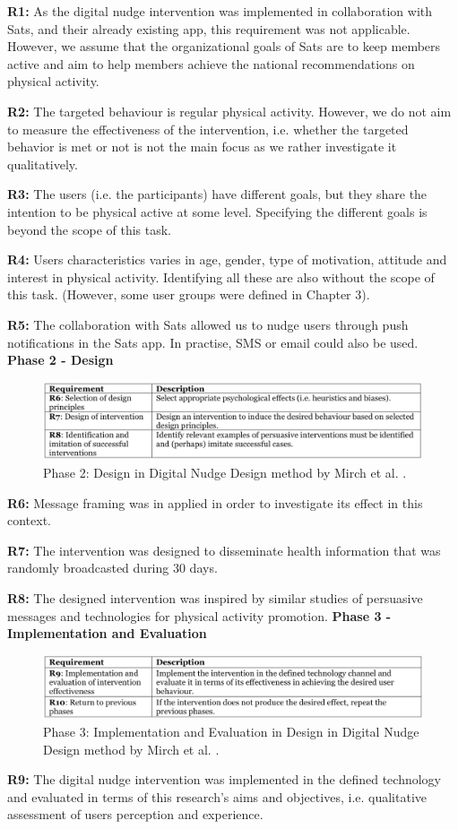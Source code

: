 \textbf{ R1:} As the digital nudge intervention was implemented in collaboration with Sats, and their already existing app, this requirement was not applicable. However, we assume that the organizational goals of Sats are to keep members active and aim to help members achieve the national recommendations on physical activity.

\textbf{R2: }The targeted behaviour is regular physical activity. However, we do not aim to measure the effectiveness of the intervention, i.e. whether the targeted behavior is met or not is not the main focus as we rather investigate it qualitatively. 

\textbf{R3:} The users (i.e. the participants)  have different goals, but they share the intention to be physical active at some level. Specifying the different goals is beyond the scope of this task.

\textbf{R4: }Users characteristics varies in age, gender, type of motivation, attitude and interest in physical activity. Identifying all these are also without the scope of this task. (However, some user groups were defined in Chapter 3).

\textbf{R5:} The collaboration with Sats allowed us to nudge users through push notifications in the Sats app. In practise, SMS or email could also be used. 
\bigbreak
\textbf{Phase 2 - Design }
\begin{figure}[h]
\includegraphics[width=1\textwidth]{images/Phase2.png}
\caption{Phase 2: Design in Digital Nudge Design method by Mirch et al. \cite{mirsch_making_2018}.}
\end{figure}
\bigbreak
\textbf{R6:} Message framing was in applied in order to investigate its effect in this context. 

\textbf{R7:} The intervention was designed to disseminate health information that was randomly broadcasted during 30 days. 

\textbf{R8:} The designed intervention was inspired by similar studies of persuasive messages and technologies for physical activity promotion. 
 \bigbreak
\textbf{Phase 3 - Implementation and Evaluation }
\bigbreak
\begin{figure}[ht]
\includegraphics[width=1\textwidth]{images/Phase3.png}
\caption{Phase 3: Implementation and Evaluation in Design in Digital Nudge Design method by Mirch et al. \cite{mirsch_making_2018}. }
\end{figure}
\bigbreak
\textbf{R9:} The digital nudge intervention was implemented in the defined technology and evaluated in terms of this research's aims and objectives, i.e. qualitative assessment of users perception and experience. 

